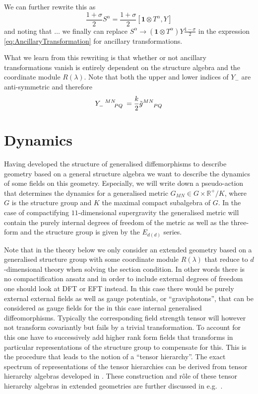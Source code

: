 We can further rewrite this as 
\begin{equation}
    \frac{1+\sigma}{2} S^\alpha = \frac{1+\sigma}{2}[\mathbf{1}\otimes T^\alpha,Y]
\end{equation}
and noting that $\ldots$  we finally can replace $S^\alpha\to (\mathbf{1}\otimes T^\alpha)Y\frac{1-\sigma}{2}$ in the expression \eqref{eq:AncillaryTransformation} for ancillary transformations. 

What we learn from this rewriting is that whether or not ancillary transformations vanish is entirely dependent on the structure algebra and the coordinate module $R(\lambda)$. Note that both the upper and lower indices of $Y_-$ are anti-symmetric and therefore
\begin{equation}
    \tensor{Y}{_-^{MN}_{PQ}} = \frac{k}{2}\tensor{\tilde{g}}{^{MN}_{PQ}}
\end{equation}



\section{Dynamics}
Having developed the structure of generalised diffemorphisms to describe geometry based on a general structure algebra we want to describe the dynamics of some fields on this geometry. Especially, we will write down a pseudo-action that determines the dynamics for a generalised metric $G_{MN}\in G\times \mathbb{R}^+/K$, where $G$ is the structure group and $K$ the maximal compact subalgebra of $G$. In the case of compactifying $11$-dimensional supergravity the generalised metric will contain the purely internal degrees of freedom of the metric as well as the three-form and the structure group is given by the $E_{d(d)}$ series. 

Note that in the theory below we only consider an extended geometry based on a generalised structure group with some coordinate module $R(\lambda)$ that reduce to $d$-dimensional theory when solving the section condition. In other words there is no compactification ansatz and in order to include external degrees of freedom one should look at DFT or EFT instead. In this case there would be purely external external fields as well as gauge potentials, or ``graviphotons'', that can be considered as gauge fields for the in this case internal generalised diffeomorphisms. Typically the corresponding field strength tensor will however not transform covariantly but fails by a trivial transformation. To account for this one have to successively add higher rank form fields that transforms in particular representations of the structure group to compensate for this. This is the procedure that  leads to the notion of a ``tensor hierarchy''. The exact spectrum of representations of the tensor hierarchies can be derived from tensor hierarchy algebras developed in \cite{Palmkvist:2013vya}. These construction and rôle of these tensor hierarchy algebras in extended geometries are further discussed in e.g.\ \cite{Carbone:2018njd,Cederwall:2018aab}.

